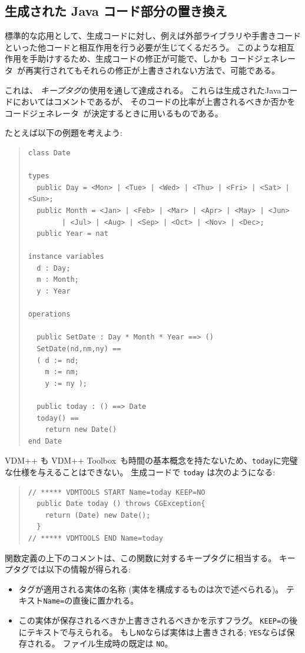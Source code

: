 \documentclass[\pformat,11pt]{jarticle}
\newcommand{\ToolboxName}{VDM++ Toolbox}
\newcommand{\tcg}{コードジェネレータ}
\begin{document}
\subsection{生成された Java コード部分の置き換え}\label{substituting}

標準的な応用として、生成コードに対し、例えば外部ライブラリや手書きコードといった他コードと相互作用を行う必要が生じてくるだろう。
このような相互作用を手助けするため、生成コードの修正が可能で、しかも \tcg\ が再実行されてもそれらの修正が上書きされない方法で、可能である。

これは、 \textit{キープタグ}の使用を通して達成される。
これらは生成されたJavaコードにおいてはコメントであるが、 そのコードの比率が上書されるべきか否かを \tcg\ が決定するときに用いるものである。

たとえば以下の例題を考えよう:
\begin{quote}
\begin{verbatim}
class Date

types
  public Day = <Mon> | <Tue> | <Wed> | <Thu> | <Fri> | <Sat> | <Sun>;
  public Month = <Jan> | <Feb> | <Mar> | <Apr> | <May> | <Jun>
        | <Jul> | <Aug> | <Sep> | <Oct> | <Nov> | <Dec>;
  public Year = nat

instance variables
  d : Day;
  m : Month;
  y : Year

operations

  public SetDate : Day * Month * Year ==> ()
  SetDate(nd,nm,ny) ==
  ( d := nd;
    m := nm;
    y := ny );

  public today : () ==> Date
  today() ==
    return new Date()
end Date
\end{verbatim}
\end{quote}
 VDM++ も \ToolboxName\ も時間の基本概念を持たないため、\texttt{today}に完璧な仕様を与えることはできない。
生成コードで \texttt{today} は次のようになる:
\begin{quote}
\begin{verbatim}
// ***** VDMTOOLS START Name=today KEEP=NO
  public Date today () throws CGException{
    return (Date) new Date();
  }
// ***** VDMTOOLS END Name=today
\end{verbatim}
\end{quote}
関数定義の上下のコメントは、この関数に対するキープタグに相当する。
キープタグでは以下の情報が得られる:
\begin{itemize}
\item タグが適用される実体の名称 (実体を構成するものは次で述べられる)。
 テキスト\texttt{Name=}の直後に置かれる。
\item この実体が保存されるべきか上書きされるべきかを示すフラグ。
 \texttt{KEEP=}の後にテキストで与えられる。
もし\texttt{NO}ならば実体は上書きされる; \texttt{YES}ならば保存される。
ファイル生成時の既定は \texttt{NO}。
\end{itemize}
\end{document}
